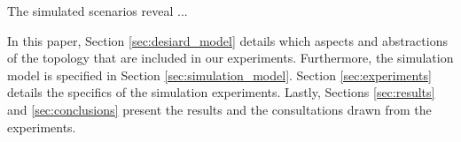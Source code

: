 The simulated scenarios reveal ...

In this paper, Section \ref{sec:desiard_model} details which aspects and abstractions of the \xcloud topology that are included in our experiments. Furthermore, the simulation model is specified in Section \ref{sec:simulation_model}. Section \ref{sec:experiments} details the specifics of the simulation experiments. Lastly, Sections \ref{sec:results} and \ref{sec:conclusions} present the results and the consultations drawn from the experiments.


